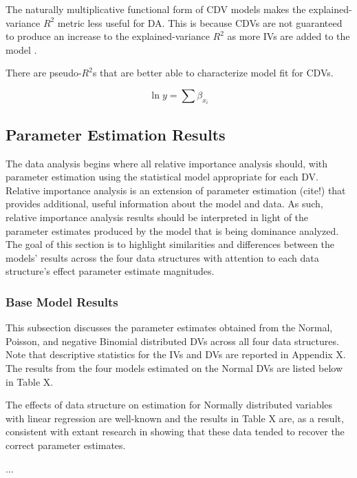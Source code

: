 \documentclass[ShortAfour,times,sageapa]{sagej}
\begin{document}
	The naturally multiplicative functional form of CDV models makes the explained-variance $R^2$ metric less useful for DA.  This is because CDVs are not guaranteed to produce an increase to the explained-variance $R^2$ as more IVs are added to the model \cite{}.  
	
	There are pseudo-$R^2$s that are better able to characterize model fit for CDVs.  
	
	
	\begin{equation}
		\ln{y} = \sum{\beta_{x_i}}
	\end{equation}

	\subsection{Parameter Estimation Results}

The data analysis begins where all relative importance analysis should, with parameter estimation using the statistical model appropriate for each DV.  
Relative importance analysis is an extension of parameter estimation (cite!) that provides additional, useful information about the model and data.  
As such, relative importance analysis results should be interpreted in light of the parameter estimates produced by the model that is being dominance analyzed.  
The goal of this section is to highlight similarities and differences between the models' results across the four data structures with attention to each data structure's effect parameter estimate magnitudes. 

\subsubsection{Base Model Results}

This subsection discusses the parameter estimates obtained from the Normal, Poisson, and negative Binomial distributed DVs across all four data structures.  
Note that descriptive statistics for the IVs and DVs are reported in Appendix X.  The results from the four models estimated on the Normal DVs are listed below in Table X.

%

The effects of data structure on estimation for Normally distributed variables with linear regression are well-known and the results in Table X are, as a result, consistent with extant research in showing that these data tended to recover the correct parameter estimates.

...
\end{document}
